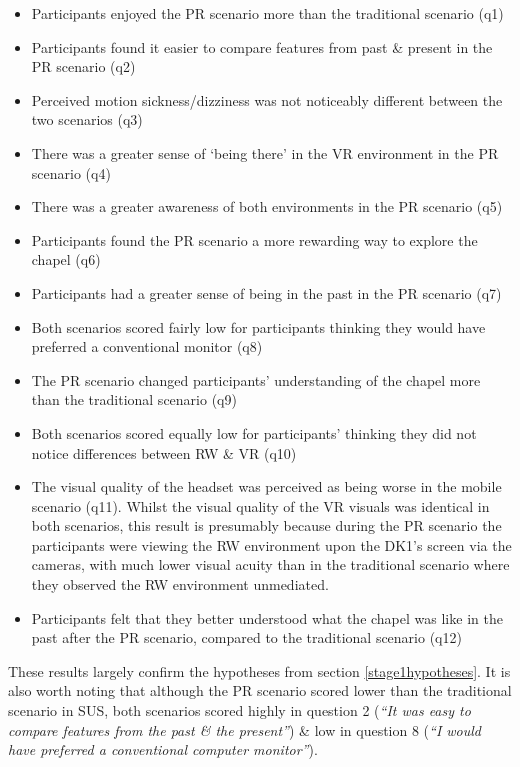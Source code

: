 \begin{itemize}
	\item Participants enjoyed the PR scenario more than the traditional scenario (q1)
	\item Participants found it easier to compare features from past \& present in the PR scenario (q2)
	\item Perceived motion sickness/dizziness was not noticeably different between the two scenarios (q3)
	\item There was a greater sense of `being there' in the VR environment in the PR scenario (q4)
	\item There was a greater awareness of both environments in the PR scenario (q5)
	\item Participants found the PR scenario a more rewarding way to explore the chapel (q6)
	\item Participants had a greater sense of being in the past in the PR scenario (q7)
	\item Both scenarios scored fairly low for participants thinking they would have preferred a conventional monitor (q8)
	\item The PR scenario changed participants’ understanding of the chapel more than the traditional scenario (q9)
	\item Both scenarios scored equally low for participants’ thinking they did not notice differences between RW \& VR (q10)
	\item The visual quality of the headset was perceived as being worse in the mobile scenario (q11). Whilst the visual quality of the VR visuals was identical in both scenarios, this result is presumably because during the PR scenario the participants were viewing the RW environment upon the DK1's screen via the cameras, with much lower visual acuity than in the traditional scenario where they observed the RW environment unmediated.
	\item Participants felt that they better understood what the chapel was like in the past after the PR scenario, compared to the traditional scenario (q12)
\end{itemize}

These results largely confirm the hypotheses from section \ref{stage1hypotheses}. It is also worth noting that although the PR scenario scored lower than the traditional scenario in SUS, both scenarios scored highly in question 2 (\textit{``It was easy to compare features from the past \& the present''}) \& low in question 8 (\textit{``I would have preferred a conventional computer monitor''}).

